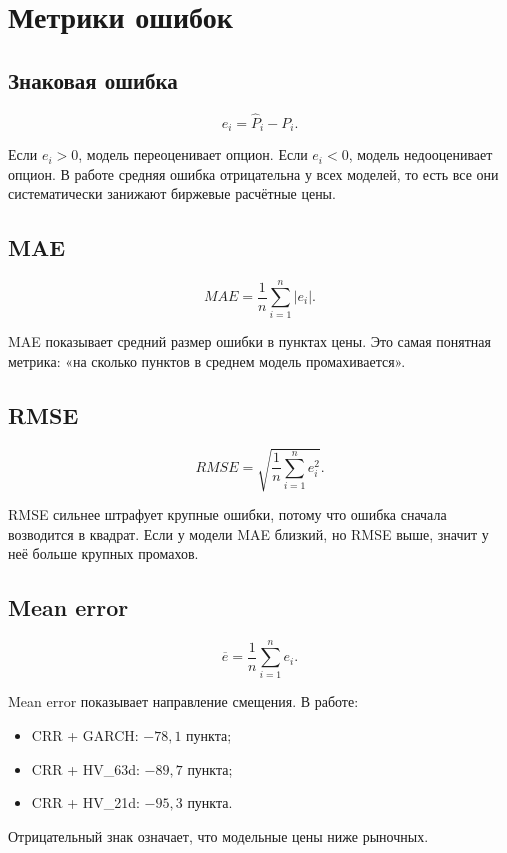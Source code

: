 \documentclass[11pt,a4paper]{article}
\begin{document}
\section{Метрики ошибок}

\subsection{Знаковая ошибка}

\[
e_i=\widehat{P}_i-P_i.
\]

Если $e_i>0$, модель переоценивает опцион. Если $e_i<0$, модель недооценивает опцион. В работе средняя ошибка отрицательна у всех моделей, то есть все они систематически занижают биржевые расчётные цены.

\subsection{MAE}

\[
MAE=\frac{1}{n}\sum_{i=1}^{n}|e_i|.
\]

MAE показывает средний размер ошибки в пунктах цены. Это самая понятная метрика: «на сколько пунктов в среднем модель промахивается».

\subsection{RMSE}

\[
RMSE=\sqrt{\frac{1}{n}\sum_{i=1}^{n}e_i^2}.
\]

RMSE сильнее штрафует крупные ошибки, потому что ошибка сначала возводится в квадрат. Если у модели MAE близкий, но RMSE выше, значит у неё больше крупных промахов.

\subsection{Mean error}

\[
\overline{e}=\frac{1}{n}\sum_{i=1}^{n}e_i.
\]

Mean error показывает направление смещения. В работе:

\begin{itemize}
    \item CRR + GARCH: $-78{,}1$ пункта;
    \item CRR + HV\_63d: $-89{,}7$ пункта;
    \item CRR + HV\_21d: $-95{,}3$ пункта.
\end{itemize}

Отрицательный знак означает, что модельные цены ниже рыночных.
\end{document}
